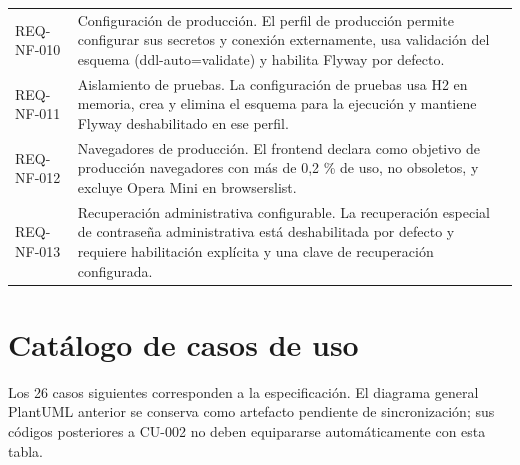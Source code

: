 \documentclass[11pt,a4paper]{article}
\begin{document}
{\begin{longtable}{@{}P{2.5cm}P{12.6cm}@{}}
REQ-NF-010 & Configuración de producción. El perfil de producción permite configurar sus secretos y conexión externamente, usa validación del esquema (ddl-auto=validate) y habilita Flyway por defecto.\\
REQ-NF-011 & Aislamiento de pruebas. La configuración de pruebas usa H2 en memoria, crea y elimina el esquema para la ejecución y mantiene Flyway deshabilitado en ese perfil.\\
REQ-NF-012 & Navegadores de producción. El frontend declara como objetivo de producción navegadores con más de 0,2 \% de uso, no obsoletos, y excluye Opera Mini en browserslist.\\
REQ-NF-013 & Recuperación administrativa configurable. La recuperación especial de contraseña administrativa está deshabilitada por defecto y requiere habilitación explícita y una clave de recuperación configurada.\\
\end{longtable}
}
\clearpage
\section{Catálogo de casos de uso}
Los 26 casos siguientes corresponden a la especificación. El diagrama general
PlantUML anterior se conserva como artefacto pendiente de sincronización; sus
códigos posteriores a CU-002 no deben equipararse automáticamente con esta tabla.
\end{document}
